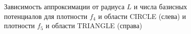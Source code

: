 \documentclass[a4paper]{article}
\begin{document}
\begin{figure}[!h]
\begin{minipage}[h]{0.49\linewidth}
  \end{minipage}
  \caption{Зависимость аппроксимации от радиуса $L$ и числа базисных потенциалов для плотности $f_4$ и области CIRCLE (слева) и  плотности $f_5$ и области TRIANGLE (справа)}
  \label{r1}
\end{figure}
\end{document}
